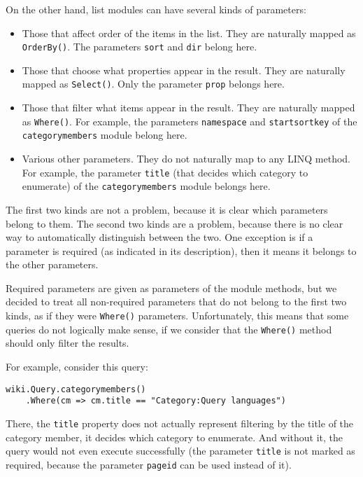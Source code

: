 \medskip

On the other hand, list modules can have several kinds of parameters:

\begin{itemize}
\item Those that affect order of the items in the list. They are naturally mapped as \lstinline{OrderBy()}.
The parameters \texttt{sort} and \texttt{dir} belong here.
\item Those that choose what properties appear in the result. They are naturally mapped as \lstinline{Select()}.
Only the parameter \texttt{prop} belongs here.
\item Those that filter what items appear in the result. They are naturally mapped as \lstinline{Where()}.
For example, the parameters \texttt{namespace} and \texttt{startsortkey}
of the \texttt{categorymembers} module belong here.
\item Various other parameters. They do not naturally map to any LINQ method.
For example, the parameter \texttt{title} (that decides which category to enumerate)
of the \texttt{categorymembers} module belongs here.
\end{itemize}

The first two kinds are not a problem, because it is clear which parameters belong to them.
The second two kinds are a problem, because there is no clear way to automatically distinguish between the two.
One exception is if a parameter is required (as indicated in its description),
then it means it belongs to the other parameters.

Required parameters are given as parameters of the module methods,
but we decided to treat all non-required parameters that do not belong to the first two kinds,
as if they were \lstinline{Where()} parameters.
Unfortunately, this means that some queries do not logically make sense,
if we consider that the \lstinline{Where()} method should only filter the results.

For example, consider this query:

\begin{lstlisting}
wiki.Query.categorymembers()
    .Where(cm => cm.title == "Category:Query languages")
\end{lstlisting}

There, the \lstinline{title} property does not actually represent filtering
by the title of the category member, it decides which category to enumerate.
And without it, the query would not even execute successfully
(the parameter \texttt{title} is not marked as required, because the parameter \texttt{pageid} can be used instead of it).

